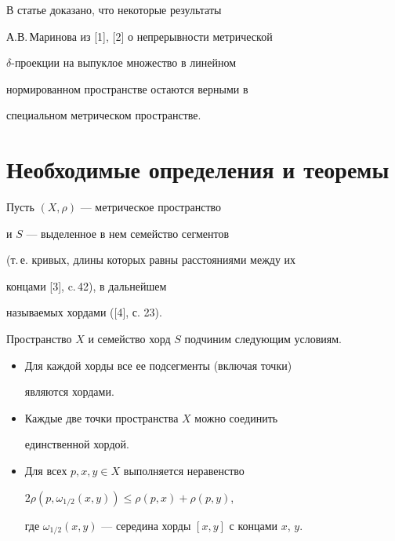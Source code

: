 \label{begin}








В статье доказано, что некоторые результаты 


А.В.\,Маринова из [1], [2] о непрерывности метрической


$\delta$-проекции на выпуклое множество в линейном 


нормированном пространстве остаются верными в


специальном метрическом пространстве.





\section{Необходимые определения и теоремы}





Пусть $(X,\rho )$ --- метрическое пространство


и $S$ --- выделенное в нем семейство сегментов


(т.\,е. кривых, длины которых равны расстояниями между их


концами [3], c.\,42), в дальнейшем


называемых хордами ([4], с. 23). 


Пространство $X$ и семейство хорд $S$ подчиним следующим условиям.


\begin{itemize}


\item[A.] Для каждой хорды все ее подсегменты (включая точки) 


являются хордами.


\item[B.] Каждые две точки пространства $X$ можно соединить 


единственной хордой.


\item[C.] Для всех $p, x,  y \in X$ выполняется неравенство 


$2\rho (p,\omega_{1/2}(x,y)) \leq \rho (p,x) + \rho (p,y)$,


где $\omega_{1/2}(x,y)$ --- середина хорды $[x,y]$ с концами $x$, $y$.


\end{itemize}






